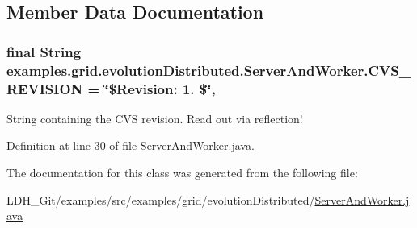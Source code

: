 \subsection{Member Data Documentation}
\hypertarget{classexamples_1_1grid_1_1evolution_distributed_1_1_server_and_worker_a41a7ce45203c837dd7d1cd406711f4e6}{
\subsubsection[{C\-V\-S\-\_\-\-R\-E\-V\-I\-S\-I\-O\-N}]{\setlength{\rightskip}{0pt plus 5cm}final String examples.\-grid.\-evolution\-Distributed.\-Server\-And\-Worker.\-C\-V\-S\-\_\-\-R\-E\-V\-I\-S\-I\-O\-N = \char`\"{}\$Revision\-: 1. \$\char`\"{}\hspace{0.3cm}{\ttfamily [static]}, {\ttfamily [private]}}}\label{classexamples_1_1grid_1_1evolution_distributed_1_1_server_and_worker_a41a7ce45203c837dd7d1cd406711f4e6}
String containing the C\-V\-S revision. Read out via reflection! 

Definition at line 30 of file Server\-And\-Worker.\-java.



The documentation for this class was generated from the following file\-:\begin{DoxyCompactItemize}
\item 
L\-D\-H\-\_\-\-Git/examples/src/examples/grid/evolution\-Distributed/\hyperlink{evolution_distributed_2_server_and_worker_8java}{Server\-And\-Worker.\-java}\end{DoxyCompactItemize}
